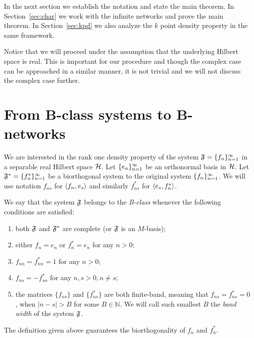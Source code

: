 \documentclass[12pt,oneside,a4paper]{amsart}
\begin{document}
  In the next section we establish the notation and state the main theorem.
  In Section~\ref{sec:char} we work with the infinite networks and prove the main theorem.
  In Section~\ref{sec:kpd} we also analyze the $k$ point density property in the same framework.

  Notice that we will proceed under the assumption that the underlying Hilbert space is real.
  This is important for our procedure and though the complex case can be approached in
    a similar manner, it is not trivial and we will not discuss the complex case further.
\bigskip
\section{From B-class systems to B-networks}
    \label{sec:refor}
    \label{fsys2graphs}
    We are interested in the rank one density property of the system $\fsys = \seq{f}$
      in a separable real Hilbert space $\cal{H}$.
    Let $\seq{e}$ be an orthonormal basis in $\cal{H}$.
    Let $\fstarsys = \{f_n^{*}\}_{n=1}^\infty$ be a biorthogonal system to the original system $\seq{f}$.
    We will use notation $f_{ns}$ for $\inner{f_n}{e_s}$ and similarly $f^*_{ns}$ for $\inner{e_s}{f^*_n}$.
    \begin{definition}
      We say that the system $\fsys$ belongs to the \emph{B-class} whenever the following conditions are satisfied:
      \begin{enumerate}[label=\textbf{C\arabic*}]
        \item \label{c1} both $\fsys$ and $\fstarsys$ are complete (or $\fsys$ is an $M$-basis);
        \item \label{c2} either $f_n = e_n$ or $f^*_n = e_n$ for any $n > 0$;
        \item \label{c3} $f_{nn} = f^*_{nn} = 1$ for any $n > 0$;
        \item \label{c4} $f_{ns} = -f^*_{sn}$ for any $n, s > 0, n \neq s$;
        \item \label{c5} the matrices $\{f_{ns}\}$ and $\{f^*_{ns}\}$ are both finite-band,
            meaning that $f_{ns} = f^*_{ns} = 0$, when $\lvert n - s \rvert > B$ for some $B \in \mathbb{N}$.
          We will call such smallest $B$ the \emph{band width} of the system $\fsys$.
      \end{enumerate}
    \end{definition}
    \begin{prop}
      The definition given above guarantees the biorthogonality of $f_n$ and $f^*_n$.
    \end{prop}
\end{document}
